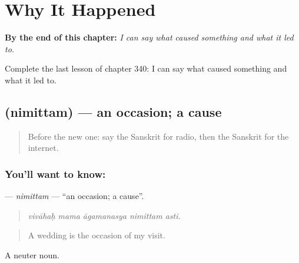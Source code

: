 
\chapter{Why It Happened}
\label{ch:sa-why-it-happened}

\begin{chapteropening}
\textbf{By the end of this chapter:} \emph{I can say what caused something and what it led to.}

Complete the last lesson of chapter 340: I can say what caused something and what it led to.
\end{chapteropening}

\section[\texorpdfstring{\sk{निमित्तम्} (nimittam)}{निमित्तम् (nimittam)}]{ (nimittam) — an occasion; a cause}

\label{lesson:SA-C340-nimittam}



\begin{quote}
Before the new one: say the Sanskrit for radio, then the Sanskrit for the internet.
\end{quote}

\subsection*{You'll want to know: }
\textbf{} — \emph{nimittam} — \textquotedblleft{}an occasion; a cause\textquotedblright{}.

\begin{quote}
    
\end{quote}

\begin{quote}
\emph{vivāhaḥ mama āgamanasya nimittam asti.}
\end{quote}

\begin{quote}
A wedding is the occasion of my visit.
\end{quote}

A neuter noun.

